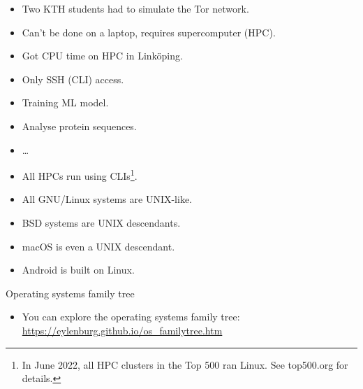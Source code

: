 \begin{frame}
  \begin{example}[Supercomputing]
    \begin{itemize}
      \item Two KTH students had to simulate the Tor network.
      \item Can't be done on a laptop, requires supercomputer (HPC).
      \item Got CPU time on HPC in Linköping.
      \item Only SSH (CLI) access.
    \end{itemize}
  \end{example}

  \pause

  \begin{example}
    \begin{itemize}
      \item Training ML model.
      \item Analyse protein sequences.
      \item \dots
    \end{itemize}
  \end{example}
\end{frame}

\begin{frame}
  \begin{remark}
    \begin{itemize}
      \item All HPCs run using CLIs\footnote{%
          In June 2022, all HPC clusters in the Top 500 ran Linux.
          See top500.org for details.
        }.
      \item All GNU/Linux systems are UNIX-like.
      \item BSD systems are UNIX descendants.
      \item macOS is even a UNIX descendant.
      \item Android is built on Linux.
    \end{itemize}
  \end{remark}

  \pause

  \begin{block}{Operating systems family tree}
    \begin{itemize}
      \item You can explore the operating systems family tree:
        \url{https://eylenburg.github.io/os_familytree.htm}
    \end{itemize}
  \end{block}
\end{frame}
